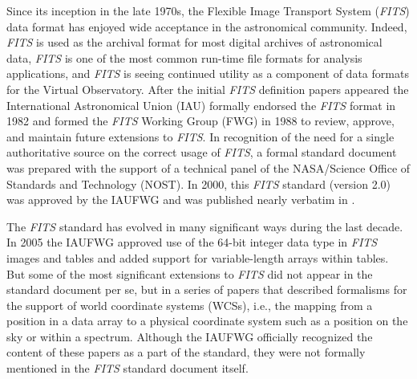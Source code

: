 \documentclass[onecolumn]{aa}
\begin{document}
 \maketitle
	     


Since its inception in the late 1970s, the Flexible Image Transport System
({\em FITS}) data format has enjoyed wide acceptance in the astronomical community.
Indeed, {\em FITS} is used as the archival format for most digital archives of
astronomical data, {\em FITS} is one of the most common run-time file formats for
analysis applications, and {\em FITS} is seeing continued utility as a component of
data formats for the Virtual Observatory. After the initial {\em FITS} definition
papers appeared \citep{wells81, greisen81} the International Astronomical
Union (IAU) formally endorsed the {\em FITS} format in 1982 and formed the {\em FITS}
Working Group (FWG) in 1988 to review, approve, and maintain future extensions
to {\em FITS}.   In recognition of the need for a single authoritative source on the
correct usage of {\em FITS}, a formal standard document was prepared with the
support of a technical panel of the NASA/Science Office of Standards and
Technology (NOST).  In 2000, this {\em FITS} standard (version 2.0) was approved by
the IAUFWG and was published nearly verbatim in \cite{hanisch01}.

The {\em FITS} standard has evolved in many significant ways during the last decade.
In 2005 the IAUFWG approved use of the 64-bit integer  data type in {\em FITS}
images and tables and added support for  variable-length arrays within tables.
But some of the most significant extensions to {\em FITS} did not appear in the
standard document per se, but in a series of papers \citep{greisen02,
calabretta02, greisen06} that described formalisms for the support of world
coordinate systems (WCSs), i.e., the mapping from a position in a data array
to a physical coordinate system such as a position on the sky or within a
spectrum. Although the IAUFWG officially recognized the content of these
papers as a part of the standard, they were not formally mentioned in the {\em FITS}
standard document itself. 
\end{document}
